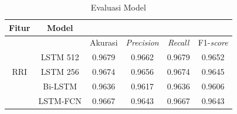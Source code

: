 \begin{table}[ht]
\caption{Evaluasi Model}
\label{hasilLSTM}
\begin{center}
\begin{tabular}{cccccc}
\hline
\multicolumn{1}{c}{Fitur} 
 & \multicolumn{1}{c}{Model}
 & \\
\hline
 & & Akurasi & \emph{Precision} & \emph{Recall} & F1-\emph{score} \\
\hline
\multirow{3}{4em}{RRI} & LSTM 512 & 0.9679 & 0.9662  & 0.9679 &  0.9652 \tabularnewline
& LSTM 256 & 0.9674 & 0.9656 &  0.9674 &  0.9645 \tabularnewline
& Bi-LSTM & 0.9636 & 0.9617  & 0.9636 &  0.9606 \tabularnewline
& LSTM-FCN & 0.9667 & 0.9643 &  0.9667  & 0.9643 \tabularnewline
\hline
\end{tabular}
\end{center}
\end{table}
